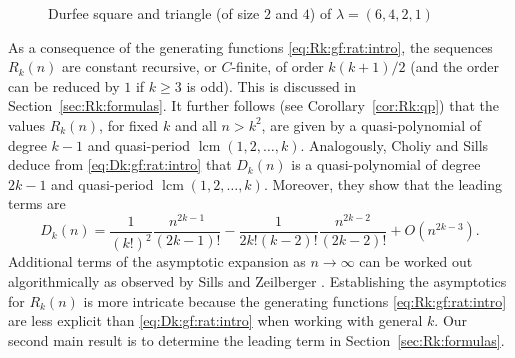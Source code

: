 \documentclass[11pt]{article}
\theoremstyle{plain}
\theoremstyle{definition}
\begin{document}
\begin{figure}[h]
  \centering
  \qquad
  
  \caption{\label{fig:durfee}Durfee square and triangle (of size $2$ and $4$)
  of $\lambda = (6, 4, 2, 1)$}
\end{figure}

As a consequence of the generating functions \eqref{eq:Rk:gf:rat:intro}, the
sequences $R_k (n)$ are constant recursive, or $C$-finite, of order $k (k + 1)
/ 2$ (and the order can be reduced by $1$ if $k \geq 3$ is odd). This is
discussed in Section~\ref{sec:Rk:formulas}. It further follows (see
Corollary~\ref{cor:Rk:qp}) that the values $R_k (n)$, for fixed $k$ and all $n
> k^2$, are given by a quasi-polynomial of degree $k - 1$ and quasi-period
$\operatorname{lcm} (1, 2, \ldots, k)$. Analogously, Choliy and Sills
\cite{cs-durfeesquare} deduce from \eqref{eq:Dk:gf:rat:intro} that $D_k (n)$
is a quasi-polynomial of degree $2 k - 1$ and quasi-period $\operatorname{lcm} (1, 2,
\ldots, k)$. Moreover, they show that the leading terms are
\begin{equation}
  D_k (n) = \frac{1}{(k!)^2} \frac{n^{2 k - 1}}{(2 k - 1) !} - \frac{1}{2 k!
  (k - 2) !} \frac{n^{2 k - 2}}{(2 k - 2) !} + O (n^{2 k - 3}) .
  \label{eq:Dk:asy:intro}
\end{equation}
Additional terms of the asymptotic expansion as $n \rightarrow \infty$ can be
worked out algorithmically as observed by Sills and Zeilberger
\cite{sz-pmn-quasi}. Establishing the asymptotics for $R_k (n)$ is more
intricate because the generating functions \eqref{eq:Rk:gf:rat:intro} are less
explicit than \eqref{eq:Dk:gf:rat:intro} when working with general $k$. Our
second main result is to determine the leading term in
Section~\ref{sec:Rk:formulas}.
\end{document}
